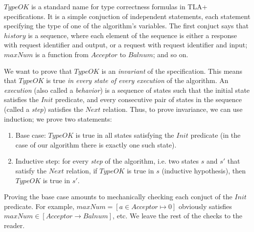 \documentclass[12pt,a4paper,en]{pracamgr}
\newcommand{\ti}[1]{\textit{#1}}
\begin{document}

$TypeOK$ is a standard name for type correctness formulas in TLA+ specifications. It is a simple conjuction of independent statements, each statement specifying the type of one of the algorithm's variables. The first conjuct says that $history$ is a sequence, where each element of the sequence is either a response with request identifier and output, or a request with request identifier and input; $maxNum$ is a function from $Acceptor$ to $Balnum$; and so on.

We want to prove that $TypeOK$ is an \ti{invariant} of the specification. This means that $TypeOK$ is true \ti{in every state of every execution} of the algorithm. An \ti{execution} (also called a \ti{behavior}) is a sequence of states such that the initial state satisfies the $Init$ predicate, and every consecutive pair of states in the sequence (called a \ti{step}) satisfies the $Next$ relation. Thus, to prove invariance, we can use induction; we prove two statements:
\begin{enumerate}
    \item Base case: $TypeOK$ is true in all states satisfying the $Init$ predicate (in the case of our algorithm there is exactly one such state).
    \item Inductive step: for every \ti{step} of the algorithm, i.e. two states $s$ and $s'$ that satisfy the $Next$ relation, if $TypeOK$ is true in $s$ (inductive hypothesis), then $TypeOK$ is true in $s'$.
\end{enumerate} 

Proving the base case amounts to mechanically checking each conjuct of the $Init$ predicate. For example, $maxNum = [a \in Acceptor \mapsto 0]$ obviously satisfies\\
$maxNum \in [Acceptor \rightarrow Balnum]$, etc. We leave the rest of the checks to the reader.
\end{document}
